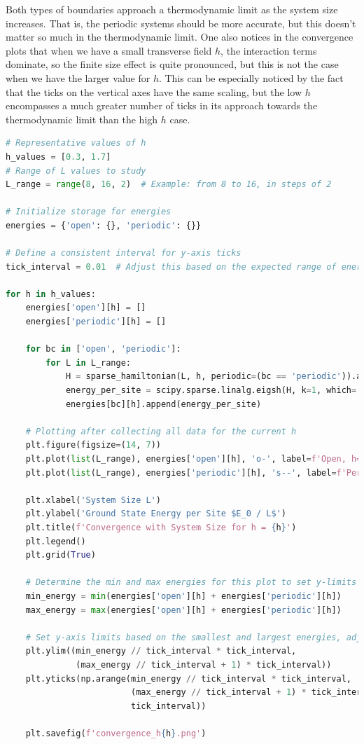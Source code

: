 \documentclass[12pt]{article}
\begin{document}
Both types of boundaries approach a thermodynamic limit as the system size increases. That is, the periodic systems should be more accurate, but this doesn't matter so much in the thermodynamic limit. One also notices in the convergence plots that when we have a small transverse field $h$, the interaction terms dominate, so the finite size effect is quite pronounced, but this is not the case when we have the larger value for $h$. This can be especially noticed by the fact that the ticks on the vertical axes have the same scaling, but the low $h$ encompasses a much greater number of ticks in its approach towards the thermodynamic limit than the high $h$ case.
\begin{lstlisting}[language=Python]
# Representative values of h
h_values = [0.3, 1.7]
# Range of L values to study
L_range = range(8, 16, 2)  # Example: from 8 to 16, in steps of 2

# Initialize storage for energies
energies = {'open': {}, 'periodic': {}}

# Define a consistent interval for y-axis ticks
tick_interval = 0.01  # Adjust this based on the expected range of energy values

for h in h_values:
    energies['open'][h] = []
    energies['periodic'][h] = []

    for bc in ['open', 'periodic']:
        for L in L_range:
            H = sparse_hamiltonian(L, h, periodic=(bc == 'periodic')).asformat('csr')
            energy_per_site = scipy.sparse.linalg.eigsh(H, k=1, which='SA', return_eigenvectors=False)[0] / L
            energies[bc][h].append(energy_per_site)

    # Plotting after collecting all data for the current h
    plt.figure(figsize=(14, 7))
    plt.plot(list(L_range), energies['open'][h], 'o-', label=f'Open, h={h}')
    plt.plot(list(L_range), energies['periodic'][h], 's--', label=f'Periodic, h={h}')

    plt.xlabel('System Size L')
    plt.ylabel('Ground State Energy per Site $E_0 / L$')
    plt.title(f'Convergence with System Size for h = {h}')
    plt.legend()
    plt.grid(True)

    # Determine the min and max energies for this plot to set y-limits appropriately
    min_energy = min(energies['open'][h] + energies['periodic'][h])
    max_energy = max(energies['open'][h] + energies['periodic'][h])

    # Set y-axis limits based on the smallest and largest energies, adjusted to the nearest tick
    plt.ylim((min_energy // tick_interval * tick_interval, 
              (max_energy // tick_interval + 1) * tick_interval))
    plt.yticks(np.arange(min_energy // tick_interval * tick_interval, 
                         (max_energy // tick_interval + 1) * tick_interval, 
                         tick_interval))

    plt.savefig(f'convergence_h{h}.png')
\end{lstlisting}
\end{document}
